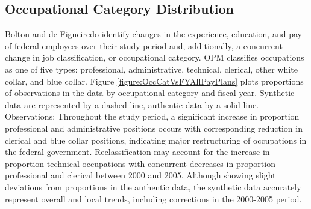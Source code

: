 \documentclass[10pt, letterpaper]{article}
\begin{document}
\begin{spacing}{1.0}
\clearpage

\subsection{Occupational Category Distribution}

Bolton and de Figueiredo identify changes in the experience, education, and pay of federal employees over their study period and, additionally, a concurrent change in job classification, or occupational category.  OPM classifies occupations as one of five types:  professional, administrative, technical, clerical, other white collar, and blue collar.  Figure \ref{figure:OccCatVsFYAllPayPlans} plots proportions of observations in the data by occupational category and fiscal year.  Synthetic data are represented by a dashed line, authentic data by a solid line.\\

Observations:  Throughout the study period, a significant increase in proportion professional and administrative positions occurs with corresponding reduction in clerical and blue collar positions, indicating major restructuring of occupations in the federal government.  Reclassification may account for the increase in proportion technical occupations with concurrent decreases in proportion professional and clerical between 2000 and 2005.  Although showing slight deviations from proportions in the authentic data, the synthetic data accurately represent overall and local trends, including corrections in the 2000-2005 period.\\

\vspace{20pt}


\end{spacing}
\end{document}
